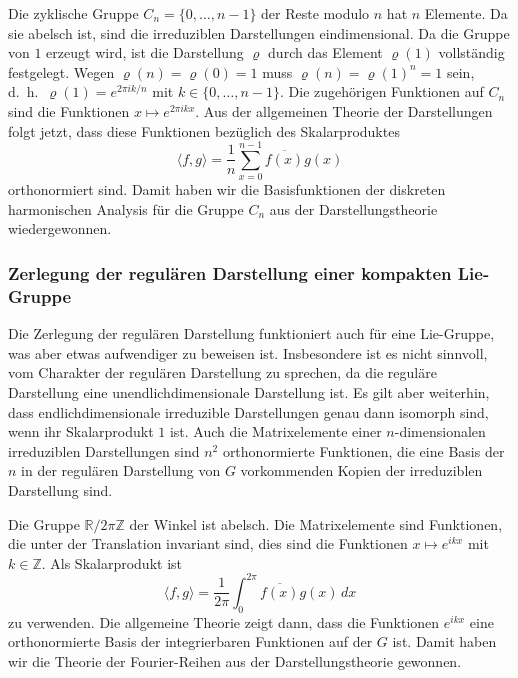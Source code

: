 \begin{beispiel}
Die zyklische Gruppe $C_n=\{0,\dots,n-1\}$ der Reste modulo $n$ hat $n$
Elemente.
Da sie abelsch ist, sind die irreduziblen Darstellungen eindimensional.
Da die Gruppe von $1$ erzeugt wird, ist die Darstellung $\varrho$ durch
das Element $\varrho(1)$ vollständig festgelegt.
Wegen $\varrho(n)=\varrho(0)=1$ muss $\varrho(n)=\varrho(1)^n =1$ sein,
d.~h.~$\varrho(1)=e^{2\pi ik/n}$ mit $k\in \{0,\dots,n-1\}$.
Die zugehörigen Funktionen auf $C_n$ sind  die Funktionen
$x\mapsto e^{2\pi ikx}$.
Aus der allgemeinen Theorie der Darstellungen folgt jetzt, dass diese
Funktionen bezüglich des Skalarproduktes
\[
\langle f,g\rangle
=
\frac{1}{n} \sum_{x=0}^{n-1} \overline{f(x)} g(x)
\]
orthonormiert sind.
Damit haben wir die Basisfunktionen der diskreten harmonischen
Analysis für die Gruppe $C_n$ aus der Darstellungstheorie wiedergewonnen.
\end{beispiel}

%
%
\subsubsection{Zerlegung der regulären Darstellung einer kompakten Lie-Gruppe}
Die Zerlegung der regulären Darstellung funktioniert auch für eine
Lie-Gruppe, was aber etwas aufwendiger zu beweisen ist.
Insbesondere ist es nicht sinnvoll, vom Charakter der regulären Darstellung
zu sprechen, da die reguläre Darstellung eine unendlichdimensionale 
Darstellung ist.
Es gilt aber weiterhin, dass endlichdimensionale irreduzible
Darstellungen genau dann isomorph sind, wenn ihr Skalarprodukt $1$ ist.
Auch die Matrixelemente einer $n$-dimensionalen irreduziblen Darstellungen
sind $n^2$ orthonormierte Funktionen, die eine Basis der $n$ in der
regulären Darstellung von $G$ vorkommenden Kopien der irreduziblen
Darstellung sind.

\begin{beispiel}
Die Gruppe $\mathbb{R}/2\pi\mathbb{Z}$ der Winkel ist abelsch.
Die Matrixelemente sind Funktionen, die unter der Translation invariant
sind, dies sind die Funktionen $x\mapsto e^{ikx}$ mit $k\in \mathbb{Z}$.
Als Skalarprodukt ist
\[
\langle f,g\rangle
=
\frac{1}{2\pi}
\int_0^{2\pi} \overline{f(x)}g(x)\,dx
\]
zu verwenden.
Die allgemeine Theorie zeigt dann, dass die Funktionen $e^{ikx}$ eine
orthonormierte Basis der integrierbaren Funktionen auf der $G$ ist.
Damit haben wir die Theorie der Fourier-Reihen aus der Darstellungstheorie
gewonnen.
\end{beispiel}




